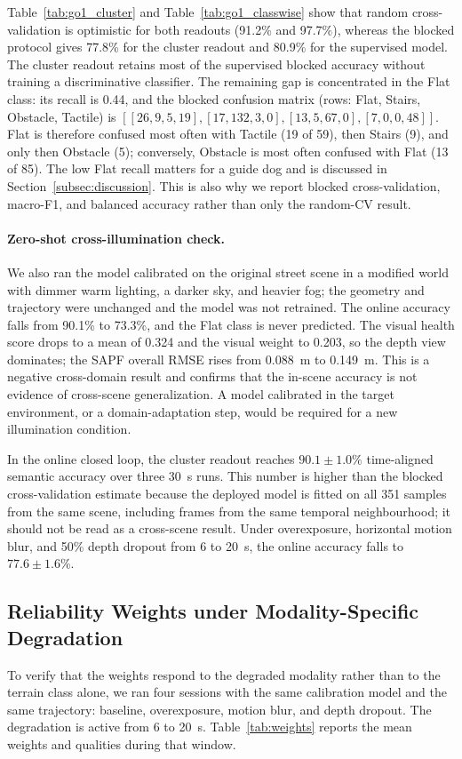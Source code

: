 \documentclass[final,3p,times]{elsarticle}
\begin{document}
Table~\ref{tab:go1_cluster} and Table~\ref{tab:go1_classwise} show that random cross-validation is optimistic for both readouts (91.2\% and 97.7\%), whereas the blocked protocol gives 77.8\% for the cluster readout and 80.9\% for the supervised model. The cluster readout retains most of the supervised blocked accuracy without training a discriminative classifier. The remaining gap is concentrated in the Flat class: its recall is 0.44, and the blocked confusion matrix (rows: Flat, Stairs, Obstacle, Tactile) is $[[26,9,5,19],[17,132,3,0],[13,5,67,0],[7,0,0,48]]$. Flat is therefore confused most often with Tactile (19 of 59), then Stairs (9), and only then Obstacle (5); conversely, Obstacle is most often confused with Flat (13 of 85). The low Flat recall matters for a guide dog and is discussed in Section~\ref{subsec:discussion}. This is also why we report blocked cross-validation, macro-F1, and balanced accuracy rather than only the random-CV result.

\paragraph{Zero-shot cross-illumination check.}
We also ran the model calibrated on the original street scene in a modified world with dimmer warm lighting, a darker sky, and heavier fog; the geometry and trajectory were unchanged and the model was not retrained. The online accuracy falls from 90.1\% to 73.3\%, and the Flat class is never predicted. The visual health score drops to a mean of 0.324 and the visual weight to 0.203, so the depth view dominates; the SAPF overall RMSE rises from 0.088~m to 0.149~m. This is a negative cross-domain result and confirms that the in-scene accuracy is not evidence of cross-scene generalization. A model calibrated in the target environment, or a domain-adaptation step, would be required for a new illumination condition.

In the online closed loop, the cluster readout reaches $90.1\pm1.0\%$ time-aligned semantic accuracy over three 30~s runs. This number is higher than the blocked cross-validation estimate because the deployed model is fitted on all 351 samples from the same scene, including frames from the same temporal neighbourhood; it should not be read as a cross-scene result. Under overexposure, horizontal motion blur, and 50\% depth dropout from 6 to 20~s, the online accuracy falls to $77.6\pm1.6\%$.

\subsection{Reliability Weights under Modality-Specific Degradation}
\label{subsec:weights_exp}
To verify that the weights respond to the degraded modality rather than to the terrain class alone, we ran four sessions with the same calibration model and the same trajectory: baseline, overexposure, motion blur, and depth dropout. The degradation is active from 6 to 20~s. Table~\ref{tab:weights} reports the mean weights and qualities during that window.
\end{document}
